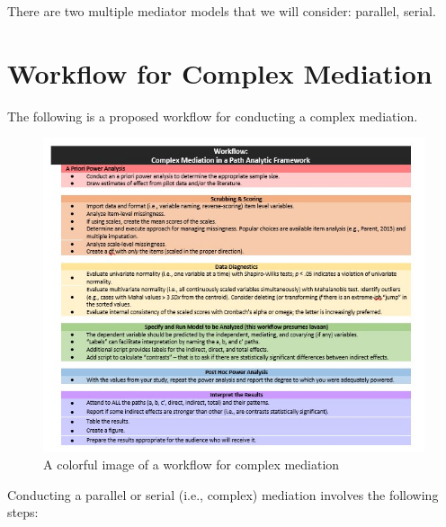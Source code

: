 \documentclass[
  11pt,
]{book}
\begin{document}
There are two multiple mediator models that we will consider: parallel, serial.

\hypertarget{workflow-for-complex-mediation}{%
\section{Workflow for Complex Mediation}\label{workflow-for-complex-mediation}}

The following is a proposed workflow for conducting a complex mediation.

\begin{figure}
\centering
\includegraphics{images/CompMed/CompMedWorkflow.jpg}
\caption{A colorful image of a workflow for complex mediation}
\end{figure}

Conducting a parallel or serial (i.e., complex) mediation involves the following steps:
\end{document}
